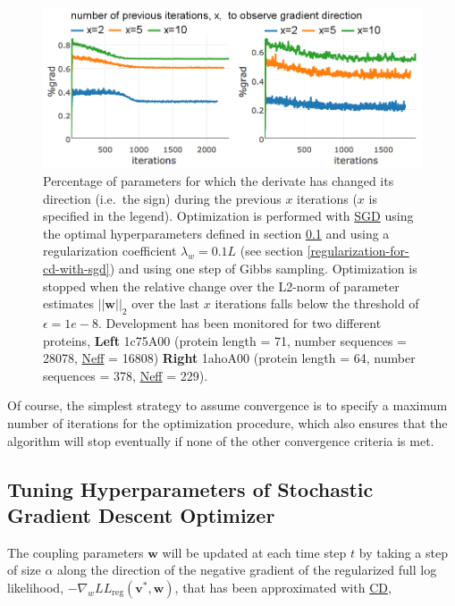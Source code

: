 \documentclass[11pt,a4paper,twoside]{book}
\newcommand{\eq}{\!=\!}
\newcommand{\LLreg}{L\!L_\mathrm{reg}}
\renewcommand{\v}{\mathbf{v}}
\newcommand{\w}{\mathbf{w}}
\theoremstyle{definition}
\theoremstyle{definition}
\theoremstyle{remark}
\begin{document}
\begin{figure}

{\centering \includegraphics[width=1\linewidth]{img/full_likelihood/sgd/percentage_changes_in_gradient_direction_1c75A00_1ahoA00} 

}

\caption{Percentage of parameters for which the
derivate has changed its direction (i.e.~the sign) during the previous
\(x\) iterations (\(x\) is specified in the legend). Optimization is
performed with \protect\hyperlink{abbrev}{SGD} using the optimal
hyperparameters defined in section \ref{sgd-hyperparameter-tuning} and
using a regularization coefficient \(\lambda_w \eq 0.1L\) (see section
\ref{regularization-for-cd-with-sgd}) and using one step of Gibbs
sampling. Optimization is stopped when the relative change over the
L2-norm of parameter estimates \(||\w||_2\) over the last \(x\)
iterations falls below the threshold of \(\epsilon \eq 1e-8\).
Development has been monitored for two different proteins, \textbf{Left}
1c75A00 (protein length = 71, number sequences = 28078,
\protect\hyperlink{abbrev}{Neff} = 16808) \textbf{Right} 1ahoA00
(protein length = 64, number sequences = 378,
\protect\hyperlink{abbrev}{Neff} = 229).}\label{fig:gradient-directions}
\end{figure}

Of course, the simplest strategy to assume convergence is to specify a
maximum number of iterations for the optimization procedure, which also
ensures that the algorithm will stop eventually if none of the other
convergence criteria is met.

\subsection{Tuning Hyperparameters of Stochastic Gradient Descent
Optimizer}\label{sgd-hyperparameter-tuning}

The coupling parameters \(\w\) will be updated at each time step \(t\)
by taking a step of size \(\alpha\) along the direction of the negative
gradient of the regularized full log likelihood,
\(- \nabla_w \LLreg(\v^*,\w)\), that has been approximated with
\protect\hyperlink{abbrev}{CD},
\end{document}
